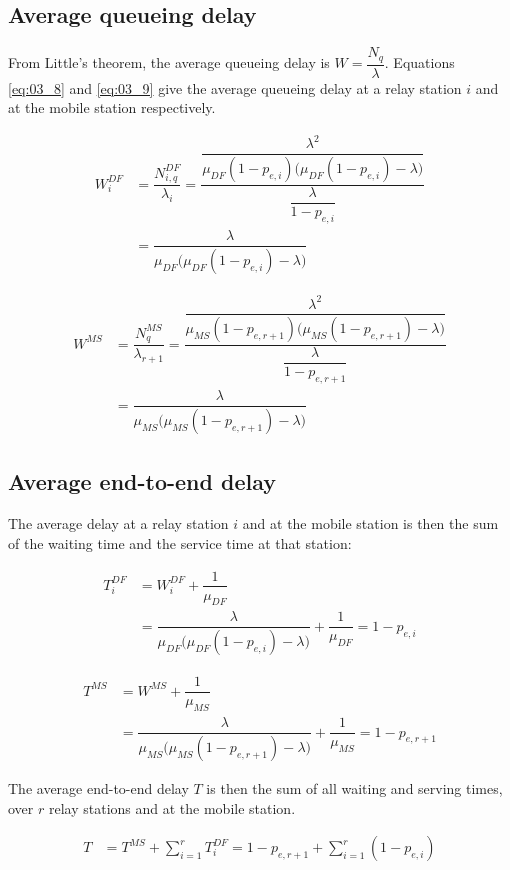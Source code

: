\subsection{Average queueing delay}

From Little's theorem, the average queueing delay is $W = \dfrac{N_q}{\lambda}$.
Equations \ref{eq:03_8} and \ref{eq:03_9} give the average queueing delay at a
relay station $i$ and at the mobile station respectively.

\begin{align}
  W_i^{DF} &= \dfrac{N_{i,q}^{DF}}{\lambda_i} =
    \dfrac{\dfrac{\lambda^2}{\mu_{DF}(1 - p_{e,i})\Big(\mu_{DF}(1 - p_{e,i}) - \lambda\Big)}} {\dfrac{\lambda}{1-p_{e,i}}} \\
         ~ &= \dfrac{\lambda}{\mu_{DF}\Big(\mu_{DF}(1 - p_{e,i})- \lambda\Big)}
  \label{eq:03_8}
\end{align}

\begin{align}
  W^{MS} &= \dfrac{N_q^{MS}}{\lambda_{r+1}} =
    \dfrac{\dfrac{\lambda^2}{\mu_{MS}(1 - p_{e,r+1})\Big(\mu_{MS}(1 - p_{e,r+1}) - \lambda\Big)}}{\dfrac{\lambda}{1-p_{e,r+1}}} \\
       ~ &= \dfrac{\lambda}{\mu_{MS}\Big(\mu_{MS}(1 - p_{e,r+1})- \lambda\Big)}
  \label{eq:03_9}
\end{align}


\subsection{Average end-to-end delay}

The average delay at a relay station $i$ and at the mobile station is then the
sum of the waiting time and the service time at that station:

\begin{align}
  T_i^{DF} &= W_i^{DF} + \dfrac{1}{\mu_{DF}} \\
         ~ &= \dfrac{\lambda}{\mu_{DF}\Big(\mu_{DF}(1 - p_{e,i})- \lambda\Big)} + \dfrac{1}{\mu_{DF}} = 1 - p_{e,i}
  \label{eq:03_10}
\end{align}

\begin{align}
  T^{MS} &= W^{MS} + \dfrac{1}{\mu_{MS}} \\
       ~ &= \dfrac{\lambda}{\mu_{MS}\Big(\mu_{MS}(1 - p_{e,r+1})- \lambda\Big)} + \dfrac{1}{\mu_{MS}} = 1 - p_{e,r+1}
  \label{eq:03_11}
\end{align}


The average end-to-end delay $T$ is then the sum of all waiting and serving times,
over $r$ relay stations and at the mobile station.

\begin{align*}
  T &= T^{MS} + \sum\limits_{i=1}^r T_i^{DF} = 1 - p_{e,r+1} + \sum\limits_{i=1}^r (1 - p_{e,i})
\end{align*}

